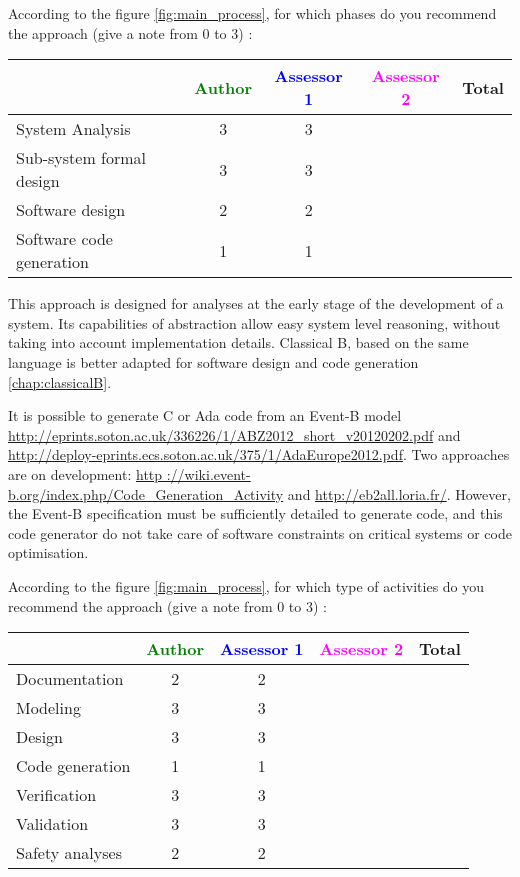 According to the figure \ref{fig:main_process}, for which phases do you recommend the approach (give a note from 0 to  3) :

\begin{tabular}{|l | c | c | c | c|}
\hline
& \textcolor{green}{Author} & \textcolor{blue}{Assessor 1} & \textcolor{magenta}{Assessor 2} & Total \\
\hline 
System Analysis & 3 & 3 & &  \\
\hline
Sub-system formal design & 3 & 3 & & \\
\hline
Software design & 2 & 2 & & \\
\hline
Software code generation & 1 & 1 & & \\
\hline
\end{tabular}

\begin{author_comment}
This approach is designed for analyses at the early stage of the development of a system. Its capabilities of abstraction allow easy system level reasoning, without taking into account implementation details. Classical B, based on the same language is better adapted for software design and code generation \ref{chap:classicalB}.

It is possible to generate C or Ada code from an Event-B model \url{http://eprints.soton.ac.uk/336226/1/ABZ2012_short_v20120202.pdf} and \url{http://deploy-eprints.ecs.soton.ac.uk/375/1/AdaEurope2012.pdf}. Two  approaches are on development: \url{http ://wiki.event-b.org/index.php/Code_Generation_Activity} and \url{http://eb2all.loria.fr/}. However, the Event-B specification must be sufficiently detailed to generate code, and this code generator do not take care of software constraints on critical systems or code optimisation.
\end{author_comment}


According to the figure \ref{fig:main_process}, for which type of activities do you recommend the approach (give a note from 0 to  3) :

\begin{tabular}{|l | c | c | c | c|}
\hline
& \textcolor{green}{Author} & \textcolor{blue}{Assessor 1} & \textcolor{magenta}{Assessor 2} & Total \\
\hline 
Documentation & 2 & 2 & &  \\
\hline
Modeling & 3 & 3 & &  \\
\hline
Design & 3 & 3 & & \\
\hline
Code generation & 1 & 1 & & \\
\hline
Verification & 3 & 3 & & \\
\hline
Validation & 3 & 3 & & \\
\hline
Safety analyses & 2 & 2 & & \\
\hline
\end{tabular}

